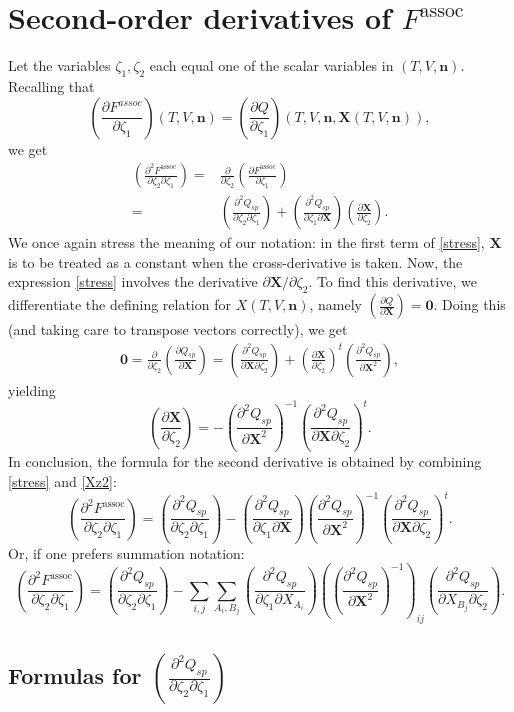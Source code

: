 \documentclass[10pt, a4paper]{article}
\newcommand{\mbf}[0]{\mathbf}
\newcommand*{\pder}[2]{\left(\frac{\partial #1}{\partial #2}\right)}
\newcommand*{\pdder}[2]{\left(\frac{\partial^2 #1}{\partial #2^2}\right)}
\newcommand*{\pdcross}[3]{\left(\frac{\partial^2 #1}{\partial #2 \partial #3}\right)}
\newcommand{\z}{\zeta}
\newcommand{\lp}{\left(}
\newcommand{\rp}{\right)}
\begin{document}
\section{Second-order derivatives of $F^{\text{assoc}}$}
Let the variables $\z_1,\z_2$ each equal one of the scalar variables in $(T,V,\mbf n)$. Recalling that 
$$
\pder{F^{assoc}}{\z_1}(T,V,\mbf n) = \pder{Q}{\z_1}(T,V,\mbf n,\mbf X(T,V,\mbf n)),
$$
we get
\begin{align}
  \pdcross{F^{\text{assoc}}}{\z_2}{\z_1} =& \frac{\partial}{\partial \z_2} \pder{F^{\text{assoc}}}{\z_1} \\
  =& \pdcross{Q_{sp}}{\z_2}{\z_1} + \pdcross{Q_{sp}}{\z_1}{\mbf X} \pder{\mbf X}{\z_2}. \label{stress}
\end{align}
We once again stress the meaning of our notation: in the first term of \eqref{stress}, $\mbf X$ is to be treated as a constant when the cross-derivative is taken. Now, the expression \eqref{stress} involves the derivative $\partial \mbf X/\partial \z_2$. To find this derivative, we differentiate the defining relation for $X(T,V,\mbf n)$, namely $\pder{Q}{\mbf X} = \mbf 0$. Doing this (and taking care to transpose vectors correctly), we get
\begin{align}
 \mbf 0 = \frac{\partial}{\partial \z_2} \pder{Q_{sp}}{\mbf X} = \pdcross{Q_{sp}}{\mbf X}{\z_2} + \pder{\mbf X}{\z_2}^t \pdder{Q_{sp}}{\mbf X},
\end{align}
yielding
\begin{equation}
  \label{Xz2}
  \pder{\mbf X}{\z_2} = - \pdder{Q_{sp}}{\mbf X}^{-1} \pdcross{Q_{sp}}{\mbf X}{\z_2}^t.
\end{equation}
In conclusion, the formula for the second derivative is obtained by combining \eqref{stress} and \eqref{Xz2}:
\begin{equation}
  \pdcross{F^{\text{assoc}}}{\z_2}{\z_1} = \pdcross{Q_{sp}}{\z_2}{\z_1} -  \pdcross{Q_{sp}}{\z_1}{\mbf X} \pdder{Q_{sp}}{\mbf X}^{-1} \pdcross{Q_{sp}}{\mbf X}{\z_2}^t.
\end{equation}
Or, if one prefers summation notation:
\begin{equation}
  \pdcross{F^{\text{assoc}}}{\z_2}{\z_1} = \pdcross{Q_{sp}}{\z_2}{\z_1} -  \sum_{i,j} \sum_{A_i,B_j} \pdcross{Q_{sp}}{\z_1}{X_{A_i}} \lp \pdder{Q_{sp}}{\mbf X}^{-1} \rp_{ij} \pdcross{Q_{sp}}{X_{B_j}}{\z_2}.
\end{equation}

\subsection{Formulas for $\pdcross{Q_{sp}}{\z_2}{\z_1}$}
\end{document}
